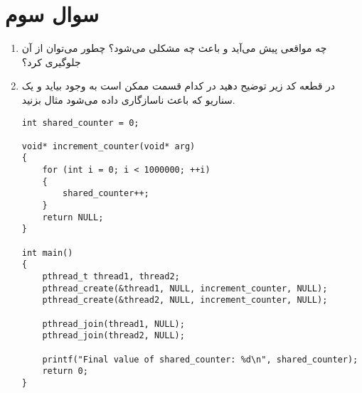 \section{سوال سوم}

\begin{enumerate}
	\item 
	  چه مواقعی پیش می‌آید و باعث چه مشکلی می‌شود؟ چطور می‌توان از آن جلوگیری کرد؟

	\begin{qsolve}
		
	\end{qsolve}
	
	
	
	
	\item 
	در قطعه کد زیر توضیح دهید  در کدام قسمت ممکن است به وجود بیاید و یک سناریو که باعث ناسازگاری داده می‌شود مثال بزنید.
	
	
\begin{latin}
\begin{lstlisting}[caption=Code of Q2, label=cpp_code_example]
int shared_counter = 0;

void* increment_counter(void* arg) 
{
	for (int i = 0; i < 1000000; ++i) 
	{
		shared_counter++;
	}
	return NULL;
}

int main() 
{
	pthread_t thread1, thread2;
	pthread_create(&thread1, NULL, increment_counter, NULL);
	pthread_create(&thread2, NULL, increment_counter, NULL);
	
	pthread_join(thread1, NULL);
	pthread_join(thread2, NULL);
	
	printf("Final value of shared_counter: %d\n", shared_counter);
	return 0;
}
\end{lstlisting}
\end{latin}
	
	
	
	
	
	\begin{qsolve}
		
	\end{qsolve}

\end{enumerate}